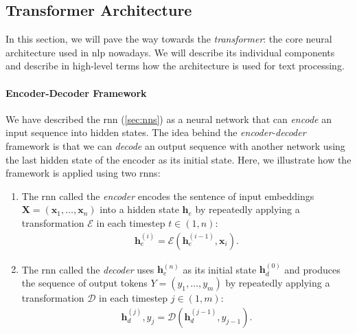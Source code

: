 {\subsection{Transformer Architecture}
\label{sec:transformer}
In this section, we will pave the way towards the \emph{transformer}: the core neural architecture used in \ac{nlp} nowadays. We will describe its individual components and describe in high-level terms how the architecture is used for text processing.

\paragraph{Encoder-Decoder Framework}
We have described the \ac{rnn} (\autoref{sec:nns}) as a neural network that can \emph{encode} an input sequence into hidden states. The idea behind the \emph{encoder-decoder} framework \cite{sutskever2014sequence,cho2014learning} is that we can \emph{decode} an output sequence with another network using the last hidden state of the encoder as its initial state. Here, we illustrate how the framework is applied using two \acp{rnn}:

\begin{enumerate}
  \item The \ac{rnn} called the \emph{encoder} encodes the sentence of input embeddings $\mathbf{X}= (\mathbf{x}_1, \ldots, \mathbf{x}_n)$ into a hidden state $\mathbf{h}_e$ by repeatedly applying a transformation $\mathcal{E}$ in each timestep $t\in(1,n)$:
        \begin{align}
          \mathbf{h}_e^{(i)} = \mathcal{E}(\mathbf{h}_e^{(i-1)}, \mathbf{x}_i).
        \end{align}
  \item The \ac{rnn} called the \emph{decoder} uses $\mathbf{h}_e^{(n)}$ as its initial state $\mathbf{h}_d^{(0)}$ and produces the sequence of output tokens  $Y = (y_1, \ldots, y_m)$ by repeatedly applying a transformation $\mathcal{D}$ in each timestep $j\in(1,m)$:
        \begin{align}
          \mathbf{h}_d^{(j)}, y_j = \mathcal{D}(\mathbf{h}_d^{(j-1)}, y_{j-1}).
        \end{align}
\end{enumerate}

}
